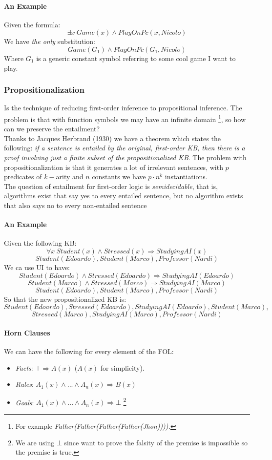 \documentclass[10pt,a4paper]{article}
\begin{document}
\paragraph{An Example}
Given the formula:
\[\exists x\ Game(x)\wedge PlayOnPc(x,Nicolo)\]
We have \textit{the only} substitution:
\[Game(G_1)\wedge PlayOnPc(G_1,Nicolo)\]
Where $G_1$ is a generic constant symbol referring to some cool game I want to play.


\subsubsection{Propositionalization}
Is the technique of reducing first-order inference to propositional inference. The problem is that with function symbols we may have an infinite domain \footnote{For example \textit{Father(Father(Father(Father(Jhon)))).}}, so how can we preserve the entailment?\\
Thanks to Jacques Herbrand (1930) we have a theorem which states the following:
\textit{if a sentence is entailed by the original, first-order KB, then there is a proof involving just a finite subset of the propositionalized KB}. The problem with propositionalization is that it generates a lot of irrelevant sentences, with $p$  predicates of $k-$arity and $n$ constants we have $p\cdot n^k$ instantiations.\\
The question of entailment for first-order logic is \textit{semidecidable}, that is, algorithms exist that say yes to every entailed sentence, but no algorithm exists that also says no to every non-entailed sentence
 
\paragraph{An Example}
Given the following KB:
\[\forall x\  Student(x) \wedge Stressed(x) \Rightarrow StudyingAI(x)\]
\[Student(Edoardo),Student(Marco), Professor(Nardi)\]
We ca use UI to have:
\[Student(Edoardo) \wedge Stressed(Edoardo) \Rightarrow StudyingAI(Edoardo)\]
\[Student(Marco) \wedge Stressed(Marco) \Rightarrow StudyingAI(Marco)\]
\[Student(Edoardo),Student(Marco), Professor(Nardi)\]
So that the new propositionalized KB is:
\[Student(Edoardo), Stressed(Edoardo), StudyingAI(Edoardo),Student(Marco),\]
\[Stressed(Marco), StudyingAI(Marco), Professor(Nardi)\]

\paragraph{Horn Clauses}
We can have the following for every element of the FOL:
\begin{itemize}
\item \textit{Facts}: $\top\Rightarrow A(x)$ ($A(x)$ for simplicity). 
\item \textit{Rules}: $A_1(x)\wedge...\wedge A_n(x)\Rightarrow B(x)$
\item \textit{Goals}: $A_1(x)\wedge...\wedge A_n(x)\Rightarrow \bot$ \footnote{We are using $\bot$ since want to prove the falsity of the premise is impossible so the premise is true.}
\end{itemize}
\end{document}
